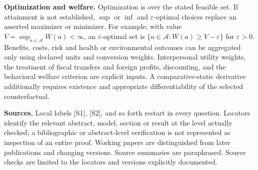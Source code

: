 \documentclass[11pt,a4paper]{article}
\begin{document}
\textbf{Optimization and welfare.} Optimization is over the stated feasible set. If attainment is not established, $\sup$ or $\inf$ and $\varepsilon$-optimal choices replace an asserted maximizer or minimizer. For example, with value $V=\sup_{a\in\mathcal A}W(a)<\infty$, an $\varepsilon$-optimal set is $\{a\in\mathcal A:W(a)\geq V-\varepsilon\}$ for $\varepsilon>0$. Benefits, costs, risk and health or environmental outcomes can be aggregated only using declared units and conversion weights. Interpersonal utility weights, the treatment of fiscal transfers and foreign profits, discounting, and the behavioral welfare criterion are explicit inputs. A comparative-static derivative additionally requires existence and appropriate differentiability of the selected counterfactual.

\textbf{Sources.} Local labels [S1], [S2], and so forth restart in every question. Locators identify the relevant abstract, model, section or result at the level actually checked; a bibliographic or abstract-level verification is not represented as inspection of an entire proof. Working papers are distinguished from later publications and changing versions. Source summaries are paraphrased. Source checks are limited to the locators and versions explicitly documented.
\end{document}
